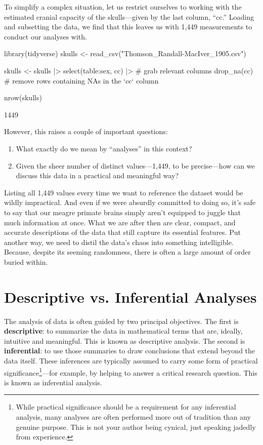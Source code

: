 

To simplify a complex situation, let us restrict ourselves to working with the estimated cranial capacity of the skulls—given by the last column, ``cc.'' Loading and subsetting the data, we find that this leaves us with 1,449 measurements to conduct our analyses with.

\begin{inR}
library(tidyverse)
skulls <- read_csv("Thomson_Randall-MacIver_1905.csv")

skulls <- skulls |> 
  select(table:sex, cc) |> # grab relevant columns
  drop_na(cc) # remove rows containing NAs in the `cc` column
  
nrow(skulls)
\end{inR}

\begin{outR}
[1] 1449
\end{outR}

\noindent
However, this raises a couple of important questions:

\begin{enumerate}
    \item What exactly do we mean by ``analyses'' in this context?
    \item Given the sheer number of distinct values—1,449, to be precise—how can we discuss this data in a practical and meaningful way?
\end{enumerate}

Listing all 1,449 values every time we want to reference the dataset would be wildly impractical. And even if we were absurdly committed to doing so, it’s safe to say that our meagre primate brains simply aren’t equipped to juggle that much information at once. What we are after then are clear, compact, and accurate descriptions of the data that still capture its essential features. Put another way, we need to distil the data's chaos into something intelligible. Because, despite its seeming randomness, there is often a large amount of order buried within.

\section{Descriptive vs. Inferential Analyses}

The analysis of data is often guided by two principal objectives. The first is \textbf{descriptive}: to summarize the data in mathematical terms that are, ideally, intuitive and meaningful. This is known as \gls{descriptive analysis}. The second is \textbf{inferential}: to use those summaries to draw conclusions that extend beyond the data itself. These inferences are typically assumed to carry some form of practical significance\footnote{While practical significance should be a requirement for any inferential analysis, many analyses are often performed more out of tradition than any genuine purpose. This is not your author being cynical, just speaking jadedly from experience.}—for example, by helping to answer a critical research question. This is known as inferential analysis.

